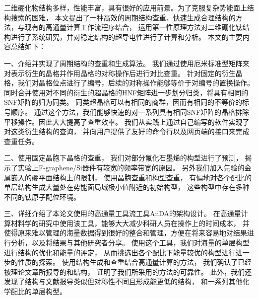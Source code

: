 \documentclass[phd,nobackinfo]{scutthesis}
\begin{document}








\begin{conclusion}\label{chapter_concludes}

二维硼化物结构多样，性能丰富，具有很好的应用前景。为了克服复杂势能面上结构搜索的困难，
本文提出了一种高效的周期结构查重、快速生成合理结构的方法，与现有的高通量计算工作流程序结合，
运用第一性原理方法对二维硼化钛结构进行了系统研究，并对稳定结构的超导电性进行了计算和分析。
本文的主要内容总结如下： 

一、介绍并实现了周期结构的查重和生成算法。
我们通过使用厄米标准型矩阵来对表示衍生的晶格并作用晶格的对称操作后进行对比查重。
针对固定的衍生晶格，我们对晶格位点进行了编号，后续的对称操作能够等价于对编号的置换操作。
同时合并使用对不同的衍生的超晶格的HNF矩阵进一步划分归类，将具有相同的SNF矩阵的归为同类。
同类超晶格可以有相同的商群，因而有相同的不等价的标号顺序。
通过这个方法，我们能够快速的对一系列具有相同SNF矩阵的晶格排除平移操作。因此大大提高了查重效率。
我们从实践上通过自己编写的软件实现了对这类衍生结构的查询，
并向用户提供了友好的命令行以及网页端的接口来完成查重任务。

二、使用固定晶胞下晶格的查重，
我们对部分氟化石墨烯的构型进行了预测，
揭示了实验上F-graphene/Si器件有较宽的频率带宽的原因。
另外我们加入先验的金属嵌入的硼平面结构上的限制，
使用晶胞查重和构型查重，
有偏地对各个配比的单层结构生成大量处在势能面局域极小值附近的初始构型，
这些构型中存在多种不同的钛原子配位环境。

三、详细介绍了本论文使用的高通量工具流工具AiiDA的架构设计。
在高通量计算材料学的研究中使用该工具，能够大大减少科研人员在操作上的时间成本，
并使得原来难以管理的海量数据得到很好的整合和管理，方便在将来容易地对结果进行分析，以及将结果与其他研究者分享。
使用这个工具，我们对海量的单层构型进行结构的优化和能量的评定，
从而挑选出各个配比下能量较优的构型进行进一步的性质的探索。
使用结构生成和查重结合高通量计算的方法，
我们确认了已经被理论文章所报导的和结构，
证明了我们所采用的方法的可靠性。
此外，我们还发现了结构与文献报导类似但对称性不同且形成能更低的结构，
和一系列其他化学配比的单层构型。


\end{conclusion}
\end{document}
